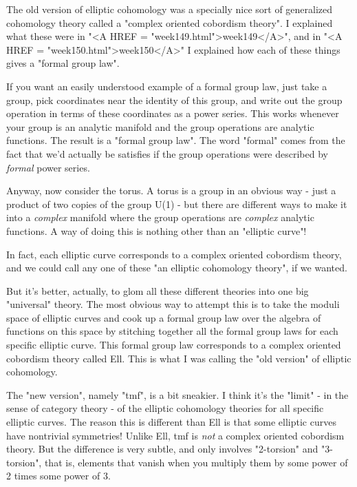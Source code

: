 The old version of elliptic cohomology was a specially nice sort
of generalized cohomology theory called a "complex oriented
cobordism theory".  I explained what these were in "<A HREF = "week149.html">week149</A>", and 
in "<A HREF = "week150.html">week150</A>" I explained how each of these things gives a "formal 
group law".  

If you want an easily understood example of a formal group law, 
just take a group, pick coordinates near the identity of this 
group, and write out the group operation in terms of these 
coordinates as a power series.  This works whenever your group is 
an analytic manifold and the group operations are analytic functions.
The result is a "formal group law".  The word "formal" comes from 
the fact that we'd actually be satisfies if the group operations
were described by \emph{formal} power series.

Anyway, now consider the torus.  A torus is a group in an obvious 
way - just a product of two copies of the group U(1) - but there 
are different ways to make it into a \emph{complex} manifold where 
the group operations are \emph{complex} analytic functions.  A way of 
doing this is nothing other than an "elliptic curve"!

In fact, each elliptic curve corresponds to a complex oriented 
cobordism theory, and we could call any one of these "an elliptic 
cohomology theory", if we wanted.

But it's better, actually, to glom all these different theories
into one big "universal" theory.  The most obvious way to attempt
this is to take the moduli space of elliptic curves and cook up 
a formal group law over the algebra of functions on this space 
by stitching together all the formal group laws for each specific 
elliptic curve.  This formal group law corresponds to a
complex oriented cobordism theory called Ell.  This is what 
I was calling the "old version" of elliptic cohomology. 

The "new version", namely "tmf", is a bit sneakier.  I think 
it's the "limit" - in the sense of category theory - of the 
elliptic cohomology theories for all specific elliptic curves.  
The reason this is different than Ell is that some elliptic 
curves have nontrivial symmetries!  Unlike Ell, tmf is \emph{not}
a complex oriented cobordism theory.  But the difference is 
very subtle, and only involves "2-torsion" and "3-torsion",
that is, elements that vanish when you multiply them by some
power of 2 times some power of 3.

